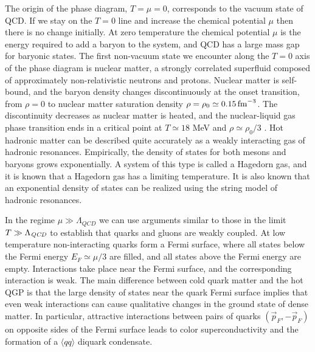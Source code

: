  The origin of the phase diagram, $T=\mu=0$, corresponds to the vacuum 
state of QCD. If we stay on the $T=0$ line and increase the chemical 
potential $\mu$ then there is no change initially. At zero temperature 
the chemical potential $\mu$ is the energy required to add a baryon to 
the system, and QCD has a large mass gap for baryonic states. The first 
non-vacuum state we encounter along the $T=0$ axis of the phase diagram 
is nuclear matter, a strongly correlated superfluid composed of approximately 
non-relativistic neutrons and protons. Nuclear matter is self-bound, and 
the baryon density changes discontinuously at the onset transition,
from $\rho=0$ to nuclear matter saturation density $\rho=\rho_0 \simeq 
0.15\,{\rm fm}^{-3}$. The discontinuity decreases as nuclear matter is 
heated, and the nuclear-liquid gas phase transition ends in a critical 
point at $T\simeq 18$ MeV and $\rho\simeq\rho_0/3$  
\cite{Sauer:1976zzf,Pochodzalla:1995xy,Elliott:2013pna}. Hot hadronic 
matter can be described quite accurately as a weakly interacting gas 
of hadronic resonances. Empirically, the density of states for both 
mesons and baryons grows exponentially. A system of this type is called 
a Hagedorn gas, and it is known that a Hagedorn gas has a limiting 
temperature. It is also known that an exponential density of states
can be realized using the string model of hadronic resonances.

 In the regime $\mu\gg\Lambda_{QCD}$ we can use arguments similar to 
those in the limit $T\gg\Lambda_{\it QCD}$ to establish that quarks and 
gluons are weakly coupled. At low temperature non-interacting quarks 
form a Fermi surface, where all states below the Fermi energy $E_F
\simeq \mu/3$ are filled, and all states above the Fermi energy 
are empty. Interactions take place near the Fermi surface, and the 
corresponding interaction is weak. The main difference between cold 
quark matter and the hot QGP is that the large density of states near 
the quark Fermi surface implies that even weak interactions can cause 
qualitative changes in the ground state of dense matter. In particular, 
attractive interactions between pairs of quarks $(\vec{p}_F,-\vec{p}_F)$
on opposite sides of the Fermi surface leads to color superconductivity 
and the formation of a $\langle qq\rangle$ diquark condensate. 

